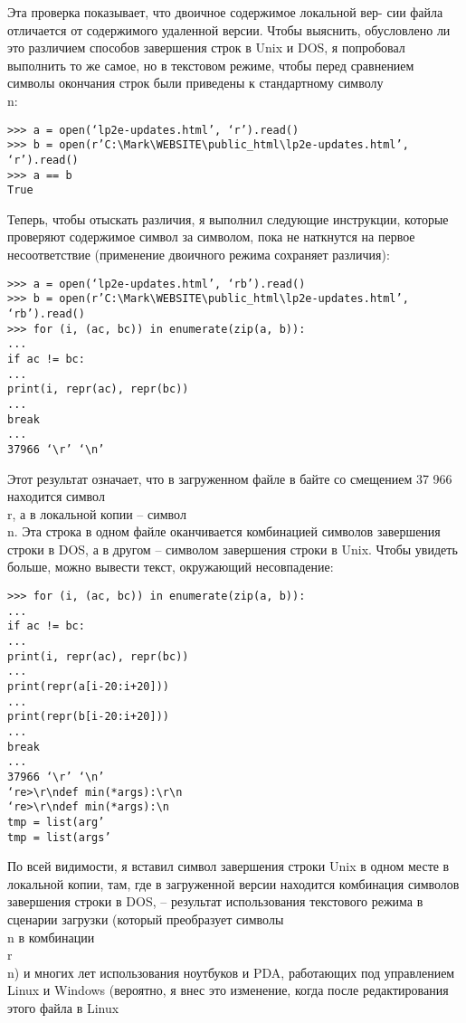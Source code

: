 \documentclass[12pt]{article}
\begin{document}
Эта проверка показывает, что двоичное содержимое локальной вер-
сии файла отличается от содержимого удаленной версии. Чтобы выяснить, обусловлено ли это различием способов завершения строк в Unix
и DOS, я попробовал выполнить то же самое, но в текстовом режиме,
чтобы перед сравнением символы окончания строк были приведены
к стандартному символу \\n:
\begin{verbatim}
>>> a = open(‘lp2e-updates.html’, ‘r’).read()
>>> b = open(r’C:\Mark\WEBSITE\public_html\lp2e-updates.html’, ‘r’).read()
>>> a == b
True
\end{verbatim}
Теперь, чтобы отыскать различия, я выполнил следующие инструкции,
которые проверяют содержимое символ за символом, пока не наткнутся на первое несоответствие (применение двоичного режима сохраняет
различия):
\begin{verbatim}
>>> a = open(‘lp2e-updates.html’, ‘rb’).read()
>>> b = open(r’C:\Mark\WEBSITE\public_html\lp2e-updates.html’, ‘rb’).read()
>>> for (i, (ac, bc)) in enumerate(zip(a, b)):
...
if ac != bc:
...
print(i, repr(ac), repr(bc))
...
break
...
37966 ‘\r’ ‘\n’
\end{verbatim}
Этот результат означает, что в загруженном файле в байте со смещением 37 966 находится символ \\r, а в локальной копии – символ \\n. Эта
строка в одном файле оканчивается комбинацией символов завершения
строки в DOS, а в другом – символом завершения строки в Unix. Чтобы
увидеть больше, можно вывести текст, окружающий несовпадение:
\begin{verbatim}
>>> for (i, (ac, bc)) in enumerate(zip(a, b)):
...
if ac != bc:
...
print(i, repr(ac), repr(bc))
...
print(repr(a[i-20:i+20]))
...
print(repr(b[i-20:i+20]))
...
break
...
37966 ‘\r’ ‘\n’
‘re>\r\ndef min(*args):\r\n
‘re>\r\ndef min(*args):\n
tmp = list(arg’
tmp = list(args’
\end{verbatim}
По всей видимости, я вставил символ завершения строки Unix в одном
месте в локальной копии, там, где в загруженной версии находится
комбинация символов завершения строки в DOS, – результат использования текстового режима в сценарии загрузки (который преобразует символы \\n в комбинации \\r\\n) и многих лет использования ноутбуков и PDA, работающих под управлением Linux и Windows (вероятно,
я внес это изменение, когда после редактирования этого файла в Linux
\end{document}
